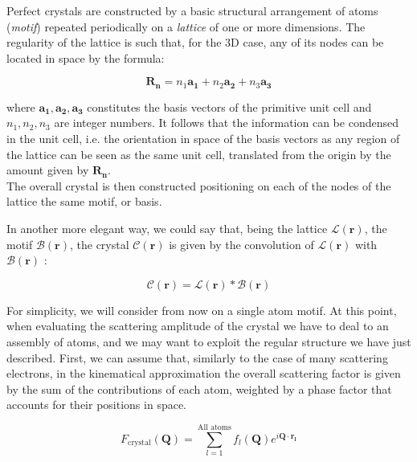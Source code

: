 Perfect crystals are constructed by a basic structural arrangement of atoms (\textit{motif}) repeated periodically on a 
\textit{lattice} of one or more dimensions. The regularity of the lattice is such that, for the 3D case, any of its nodes 
can be located in space by the formula: 

\begin{equation}
   \mathbf {R_n} = n_1\mathbf{a_1} + n_2\mathbf{a_2} + n_3\mathbf{a_3}
   \label{eq:lattice}
\end{equation}

where ${\mathbf{a_1},\mathbf{a_2},\mathbf{a_3}}$ constitutes the basis vectors of the primitive unit cell and $n_1, n_2, n_3$ are integer numbers. 
It follows that the information can be condensed in the unit cell, i.e. the orientation in space of the basis vectors as any region 
of the lattice can be seen as the same unit cell, translated from the origin by the amount given by $\mathbf {R_n}$. \\

The overall crystal is then constructed positioning on each of the nodes of the lattice the same motif, or basis. 

In another more elegant way, we could say that, being the lattice $\mathcal{L}(\mathbf r)$, the motif $\mathcal{B}(\mathbf r)$, the crystal 
$\mathcal{C}(\mathbf r)$ is given by the convolution of $\mathcal{L}(\mathbf r)$ with $\mathcal{B}(\mathbf r)$ : 

\begin{equation}
    \mathcal{C}(\mathbf r)  = \mathcal{L}(\mathbf r) \ast  \mathcal{B}(\mathbf r)  
    \label{eq:conv}
 \end{equation}

 For simplicity, we will consider from now on a single atom motif.
 At this point, when evaluating the scattering amplitude of the crystal we have to deal to an assembly of atoms, and we 
 may want to exploit the regular structure we have just described. 
 First, we can assume that, similarly to the case of many scattering electrons, in the kinematical approximation the overall 
 scattering factor is given by the sum of the contributions of each atom, weighted by a phase factor that accounts for their 
 positions in space. 

 \begin{equation}
    F_{\text{crystal}}(\mathbf{Q}) = 
   \sum_{l=1}^{\text{All atoms}} f_l(\mathbf Q) e^{i \mathbf{Q} \cdot \mathbf{r_l}} 
   \label{eq:crystalformfactor}
\end{equation} 


